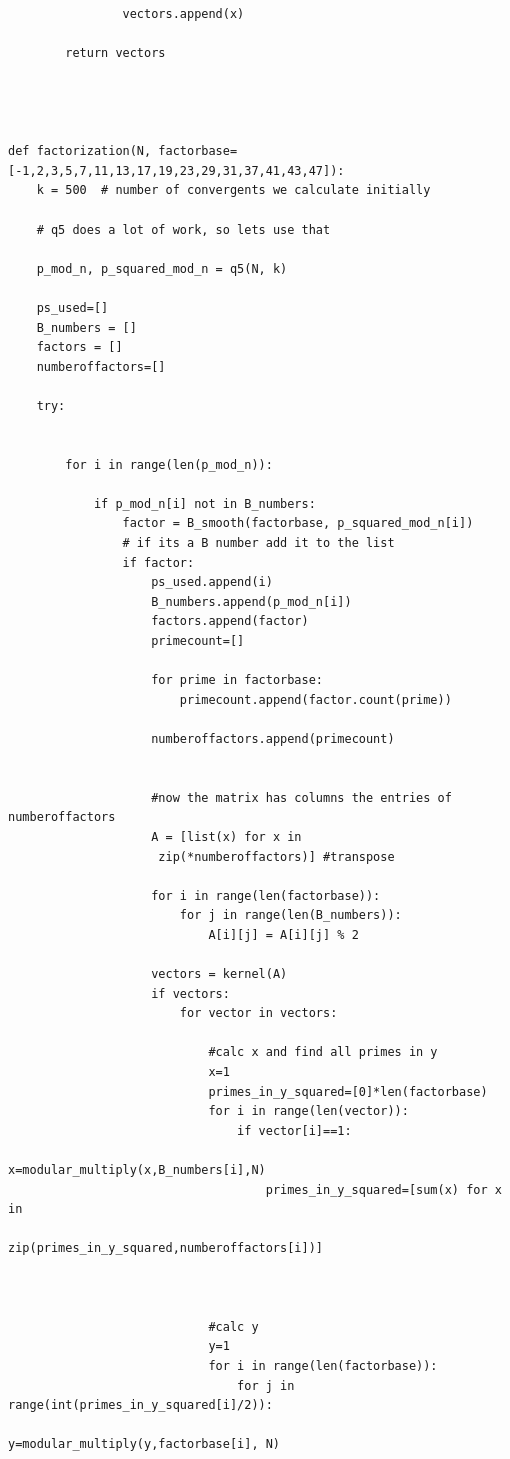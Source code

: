 \documentclass[10pt,a4paper]{report}
\begin{document}
\begin{verbatim}
                vectors.append(x)

        return vectors




def factorization(N, factorbase=[-1,2,3,5,7,11,13,17,19,23,29,31,37,41,43,47]):
    k = 500  # number of convergents we calculate initially

    # q5 does a lot of work, so lets use that

    p_mod_n, p_squared_mod_n = q5(N, k)

    ps_used=[]
    B_numbers = []
    factors = []
    numberoffactors=[]

    try:


        for i in range(len(p_mod_n)):

            if p_mod_n[i] not in B_numbers:
                factor = B_smooth(factorbase, p_squared_mod_n[i])
                # if its a B number add it to the list
                if factor:
                    ps_used.append(i)
                    B_numbers.append(p_mod_n[i])
                    factors.append(factor)
                    primecount=[]

                    for prime in factorbase:
                        primecount.append(factor.count(prime))

                    numberoffactors.append(primecount)


                    #now the matrix has columns the entries of numberoffactors
                    A = [list(x) for x in
                     zip(*numberoffactors)] #transpose

                    for i in range(len(factorbase)):
                        for j in range(len(B_numbers)):
                            A[i][j] = A[i][j] % 2

                    vectors = kernel(A)
                    if vectors:
                        for vector in vectors:

                            #calc x and find all primes in y
                            x=1
                            primes_in_y_squared=[0]*len(factorbase)
                            for i in range(len(vector)):
                                if vector[i]==1:
                                    x=modular_multiply(x,B_numbers[i],N)
                                    primes_in_y_squared=[sum(x) for x in 
                                    zip(primes_in_y_squared,numberoffactors[i])]



                            #calc y
                            y=1
                            for i in range(len(factorbase)):
                                for j in range(int(primes_in_y_squared[i]/2)):
                                    y=modular_multiply(y,factorbase[i], N)


\end{verbatim}
\end{document}
